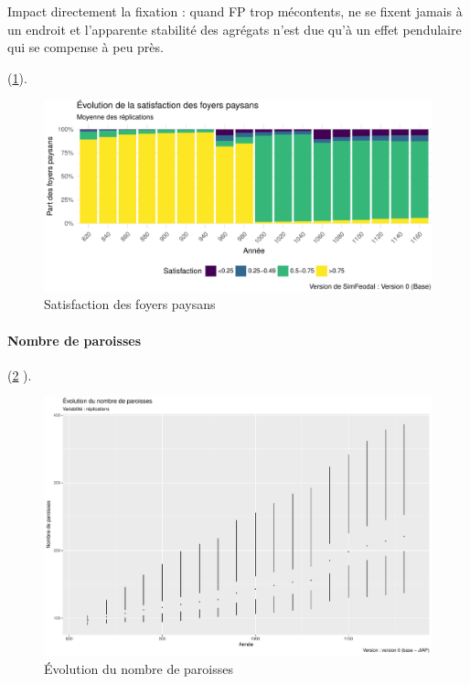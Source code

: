 Impact directement la fixation :
quand FP trop mécontents, ne se fixent jamais à un endroit et l'apparente stabilité des agrégats n'est due qu'à un effet pendulaire qui se compense à peu près.

\begin{mdframed}[backgroundcolor=gray!10,footnoteinside=false]
	(\cref{fig:satisfaction-fp-v0}).
\end{mdframed}

\begin{figure}[H]
	\captionsetup{width=\linewidth}
	\includegraphics[width=\linewidth]{img/resultats/v0_satisfaction_fp.pdf}
	\caption{Satisfaction des foyers paysans} 
	\label{fig:satisfaction-fp-v0} 
\end{figure}


\paragraph{Nombre de paroisses}

\begin{mdframed}[backgroundcolor=gray!10,footnoteinside=false]
	(\cref{fig:nb-paroisses-v0} ).
\end{mdframed}

\begin{figure}[H]
	\captionsetup{width=\linewidth}
	\includegraphics[width=\linewidth]{img/resultats/v0_nombre_paroisses.pdf}
	\caption{Évolution du nombre de paroisses} 
	\label{fig:nb-paroisses-v0} 
\end{figure}


